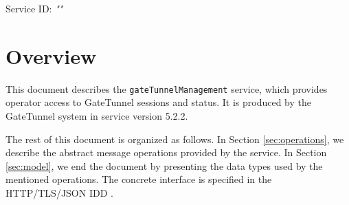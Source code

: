 \documentclass[a4paper]{arrowhead}
\begin{document}
\sloppy

\ArrowheadSetup

\begin{center}
  \vspace*{1cm}
  \huge{\arrowtitle}

  \vspace*{0.2cm}
  \LARGE{\arrowtype}
  \vspace*{1cm}

  \Large{Service ID: \textit{"\arrowid"}}

  \vspace*{\fill}


  \vspace*{1cm}
  \vspace*{\fill}

  \begin{abstract}
    This document describes the \texttt{gate\allowbreak{}Tunnel\allowbreak{}Management} service, version 5.2.2, produced by the GateTunnel support system of Arrowhead 5.2.2.
  \end{abstract}

  \vspace*{1cm}
\end{center}

\newpage

\tableofcontents
\newpage

\section{Overview}
\label{sec:overview}

This document describes the \texttt{gate\allowbreak{}Tunnel\allowbreak{}Management} service, which provides operator access to GateTunnel sessions and status.
It is produced by the GateTunnel system \cite{gt-sysd} in service version 5.2.2.

The rest of this document is organized as follows.
In Section \ref{sec:operations}, we describe the abstract message operations provided by the service.
In Section \ref{sec:model}, we end the document by presenting the data types used by the mentioned operations.
The concrete interface is specified in the HTTP/TLS/JSON IDD \cite{gt-gateTunnelManagement-http-idd}.
\end{document}
